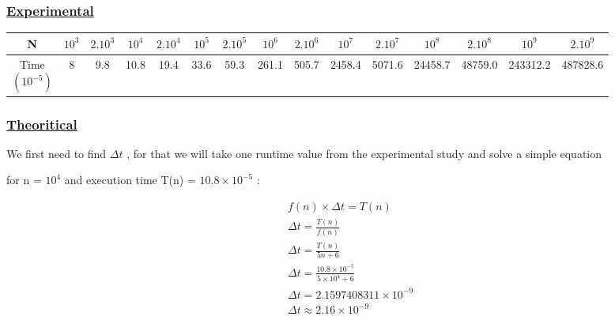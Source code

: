 \subsubsection*{\underline{Experimental}}
\begin{tabular}{|c|c|c|c|c|c|c|c|c|c|c|c|c|c|c|}
    \hline
    N & \(10^3\) & \(2.10^3\) & \(10^4\) & \(2.10^4\) & \(10^5\) & \(2.10^5\) & \(10^6\) & \(2.10^6\) & \(10^7\) & \(2.10^7\) & \(10^8\) & \(2.10^8\) & \(10^9\) & \(2.10^9\) \\
    \hline
    \makecell{Time\\\((10^{-5})\)} & 8 & 9.8 & 10.8 & 19.4 & 33.6 & 59.3 & 261.1 & 505.7 & 2458.4 & 5071.6 & 24458.7 & 48759.0 & 243312.2 & 487828.6 \\
    \hline
\end{tabular}



\vspace{1cm}

\newpage

\subsubsection*{\underline{Theoritical}}
We first need to find  \(\Delta t\) , for that we will take one runtime value from the experimental study and solve a simple equation 

\vspace{0.15cm}

for n = \(10^4\) and execution time T(n) = \(10.8\times10^{-5}\) :

\vspace{0.75cm}
\begin{align*}
&f(n)\times\Delta t = T(n)\\[0.15cm]
&\Delta t = \frac{T(n)}{f(n)} \\[0.15cm]
&\Delta t = \frac{T(n)}{5n + 6}\\[0.15cm]
&\Delta t = \frac{10.8\times10^{-5}}{5\times 10^4 + 6} \\[0.15cm]
&\Delta t = 2.1597408311\times10^{-9} \\[0.25cm]
&\boxed{\Delta t \approx 2.16\times10^{-9}}
\end{align*}





